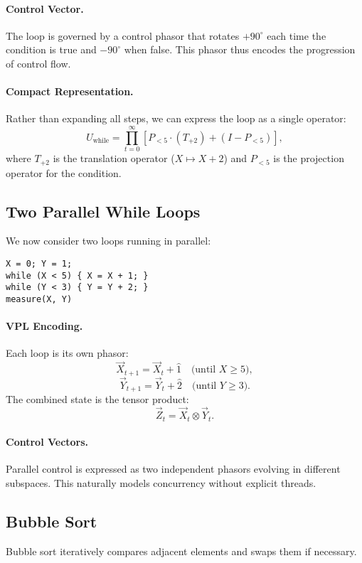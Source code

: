 \documentclass[12pt]{article}
\begin{document}
\paragraph{Control Vector.}
The loop is governed by a control phasor that rotates $+90^\circ$ each time the
condition is true and $-90^\circ$ when false. This phasor thus encodes the
progression of control flow.

\paragraph{Compact Representation.}
Rather than expanding all steps, we can express the loop as a single operator:
\[
U_{\mathrm{while}} = \prod_{t=0}^{\infty}
\left[ P_{<5} \cdot (T_{+2}) + (I - P_{<5}) \right],
\]
where $T_{+2}$ is the translation operator ($X \mapsto X+2$) and $P_{<5}$ is the
projection operator for the condition.

\subsection{Two Parallel While Loops}
We now consider two loops running in parallel:
\begin{verbatim}
X = 0; Y = 1;
while (X < 5) { X = X + 1; }
while (Y < 3) { Y = Y + 2; }
measure(X, Y)
\end{verbatim}

\paragraph{VPL Encoding.}
Each loop is its own phasor:
\[
\vec{X}_{t+1} = \vec{X}_t + \hat{1} \quad \text{(until $X \geq 5$)},
\]
\[
\vec{Y}_{t+1} = \vec{Y}_t + \hat{2} \quad \text{(until $Y \geq 3$)}.
\]
The combined state is the tensor product:
\[
\vec{Z}_t = \vec{X}_t \otimes \vec{Y}_t.
\]

\paragraph{Control Vectors.}
Parallel control is expressed as two independent phasors evolving in different
subspaces. This naturally models concurrency without explicit threads.

\subsection{Bubble Sort}
Bubble sort iteratively compares adjacent elements and swaps them if necessary.  
\end{document}
